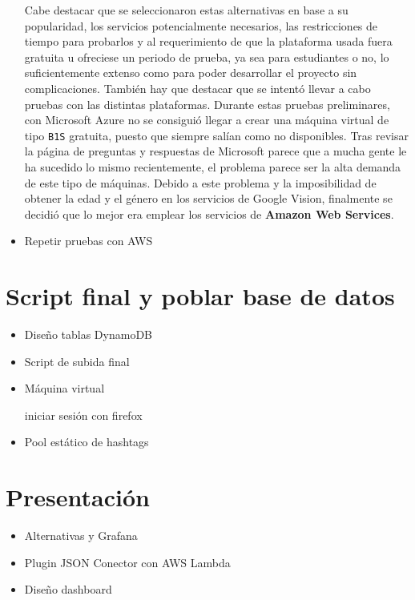 \begin{itemize}
Cabe destacar que se seleccionaron estas alternativas en base a su popularidad, los servicios potencialmente necesarios, las restricciones de tiempo para probarlos y al requerimiento de que la plataforma usada fuera gratuita u ofreciese un periodo de prueba, ya sea para estudiantes o no, lo suficientemente extenso como para poder desarrollar el proyecto sin complicaciones. También hay que destacar que se intentó llevar a cabo pruebas con las distintas plataformas. Durante estas pruebas preliminares, con Microsoft Azure no se consiguió llegar a crear una máquina virtual de tipo \texttt{B1S} gratuita, puesto que siempre salían como no disponibles. Tras revisar la página de preguntas y respuestas de Microsoft parece que a mucha gente le ha sucedido lo mismo recientemente, el problema parece ser la alta demanda de este tipo de máquinas. Debido a este problema y la imposibilidad de obtener la edad y el género en los servicios de Google Vision, finalmente se decidió que lo mejor era emplear los servicios de \textbf{Amazon Web Services}.
    
    \item Repetir pruebas con AWS
\end{itemize}

\section{Script final y poblar base de datos}
\begin{itemize}
    \item Diseño tablas DynamoDB
    \item Script de subida final
    \item Máquina virtual
    
iniciar sesión con firefox
    
    
    
    \item Pool estático de hashtags
\end{itemize}

\section{Presentación}
\begin{itemize}
    \item Alternativas y Grafana
    \item Plugin JSON Conector con AWS Lambda
    \item Diseño dashboard
\end{itemize}


